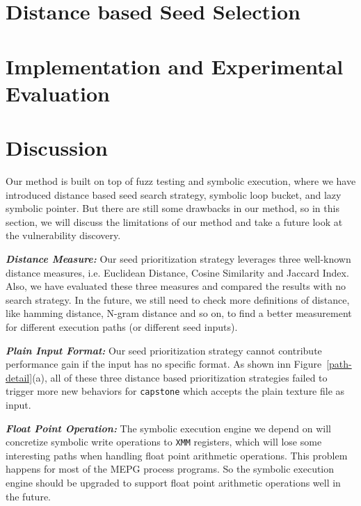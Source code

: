 \documentclass[a4paper]{article}
\begin{document}
\section{Distance based Seed Selection} \label{sec:seed selection}


\section{Implementation and Experimental Evaluation} \label{sec:evaluate}




\section{Discussion} \label{sec:discussion}
Our method is built on top of fuzz testing and symbolic execution, where we have introduced distance based seed search strategy, symbolic loop bucket, and lazy symbolic pointer. But there are still some drawbacks in our method, so in this section, we will discuss the limitations of our method and take a future look at the vulnerability discovery.

\noindent\textit{\textbf{Distance Measure:}} Our seed prioritization strategy leverages three well-known distance measures, i.e. Euclidean Distance, Cosine Similarity and Jaccard Index. Also, we have evaluated these three measures and compared the results with no search strategy. In the future, we still need to check more definitions of distance, like hamming distance, N-gram distance and so on, to find a better measurement for different execution paths (or different seed inputs). 

\noindent\textit{\textbf{Plain Input Format:}} Our seed prioritization strategy cannot contribute performance gain if the input has no specific format. As shown inn Figure~\ref{path-detail}(a), all of these three distance based prioritization strategies failed to trigger more new behaviors for \texttt{capstone} which accepts the plain texture file as input. 

\noindent\textit{\textbf{Float Point Operation:}} The symbolic execution engine we depend on will concretize symbolic write operations to \texttt{XMM} registers, which will lose some interesting paths when handling float point arithmetic operations. This problem happens for most of the MEPG process programs. So the symbolic execution engine should be upgraded to support float point arithmetic operations well in the future.
\end{document}
